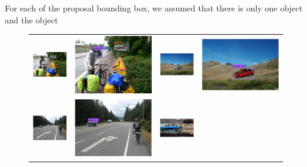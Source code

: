\documentclass[10pt,twocolumn,letterpaper]{article}
\begin{document}
For each of the proposal bounding box, we assumed that there is only one object and the object 
\begin{figure}[h]
\setlength\tabcolsep{1pt}
\centering
\begin{tabular}{|cc|cc|}
  \hline
  \includegraphics[width=0.24\linewidth]{supp/occlusion1.png} &
  \includegraphics[width=0.24\linewidth]{supp/occlusion1b.png} & 
  \includegraphics[width=0.24\linewidth]{supp/pas_car1a.png} &
  \includegraphics[width=0.24\linewidth]{supp/pas_car1b.png}  \\
  \includegraphics[width=0.24\linewidth]{supp/pas_car3a.png} &
  \includegraphics[width=0.24\linewidth]{supp/pas_car3b.png} & 
  \includegraphics[width=0.24\linewidth]{supp/pas_car5a.png} &

\end{tabular}
\end{figure}
\end{document}
